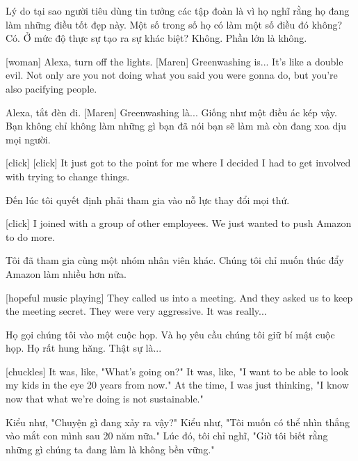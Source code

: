\documentclass[a4paper]{article}
\begin{document}
	\begin{vietnamese-v2}
		[Mara] Lý do tại sao người tiêu dùng tin tưởng các tập đoàn là vì họ nghĩ rằng họ đang làm những điều tốt đẹp này.
		Một số trong số họ có làm một số điều đó không? Có.
		Ở mức độ thực sự tạo ra sự khác biệt? Không.
		Phần lớn là không.
	\end{vietnamese-v2}
	
	[woman] Alexa, turn off the lights.
	[Maren] Greenwashing is... It's like a double evil.
	Not only are you not doing what you said you were gonna do, but you're also pacifying people.
	
	\begin{vietnamese-v2}
		[phụ nữ] Alexa, tắt đèn đi.
		[Maren] Greenwashing là... Giống như một điều ác kép vậy.
		Bạn không chỉ không làm những gì bạn đã nói bạn sẽ làm mà còn đang xoa dịu mọi người.
	\end{vietnamese-v2}
	
	[click]
	[click]
	It just got to the point for me where I decided I had to get involved with trying to change things.
	
	\begin{vietnamese-v2}
		[click]
		[click]
		Đến lúc tôi quyết định phải tham gia vào nỗ lực thay đổi mọi thứ.
	\end{vietnamese-v2}
	
	[click]
	I joined with a group of other employees.
	We just wanted to push Amazon to do more.
	
	\begin{vietnamese-v2}
		[click]
		Tôi đã tham gia cùng một nhóm nhân viên khác.
		Chúng tôi chỉ muốn thúc đẩy Amazon làm nhiều hơn nữa.
	\end{vietnamese-v2}
	
	[hopeful music playing]
	They called us into a meeting.
	And they asked us to keep the meeting secret.
	They were very aggressive. It was really...
	
	\begin{vietnamese-v2}
		Họ gọi chúng tôi vào một cuộc họp.
		Và họ yêu cầu chúng tôi giữ bí mật cuộc họp.
		Họ rất hung hăng. Thật sự là...
	\end{vietnamese-v2}
	
	[chuckles] It was, like, "What's going on?"
	It was, like, "I want to be able to look my kids in the eye 20 years from now."
	At the time, I was just thinking, "I know now that what we're doing is not sustainable."
	
	\begin{vietnamese-v2}
		 Kiểu như, "Chuyện gì đang xảy ra vậy?"
		Kiểu như, "Tôi muốn có thể nhìn thẳng vào mắt con mình sau 20 năm nữa."
		Lúc đó, tôi chỉ nghĩ, "Giờ tôi biết rằng những gì chúng ta đang làm là không bền vững."
	\end{vietnamese-v2}
	
\end{document}
